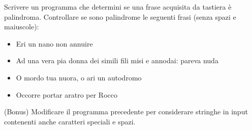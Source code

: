 \begin{Exercise}[label={ex:palindromo}]
		\Question Scrivere un programma che determini se una frase acquisita da tastiera \`e palindroma. Controllare se sono palindrome le seguenti frasi (senza spazi e maiuscole):
		\begin{itemize}
				\item Eri un nano non annuire
				\item Ad una vera pia donna dei simili fili misi e annodai: pareva nuda
				\item O mordo tua nuora, o ari un autodromo
				\item Occorre portar aratro per Rocco
		\end{itemize}
		\Question (Bonus) Modificare il programma precedente per considerare stringhe in input contenenti anche caratteri speciali e spazi.
\end{Exercise}

\begin{Answer}[ref={ex:palindromo}]
		
\end{Answer}